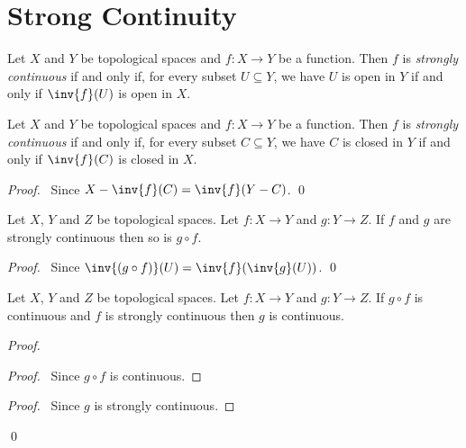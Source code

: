 \section{Strong Continuity}

\begin{definition}
    Let $X$ and $Y$ be topological spaces and $f : X \rightarrow Y$ be a function. Then $f$ is \emph{strongly continuous} if and only if, for every subset $U \subseteq Y$,
    we have $U$ is open in $Y$ if and only if $\inv{f}(U)$ is open in $X$.
\end{definition}

\begin{proposition}
    Let $X$ and $Y$ be topological spaces and $f : X \rightarrow Y$ be a function. Then $f$ is \emph{strongly continuous} if and only if, for every subset $C \subseteq Y$,
    we have $C$ is closed in $Y$ if and only if $\inv{f}(C)$ is closed in $X$.
\end{proposition}

\begin{proof}
    \pf\ Since $X - \inv{f}(C) = \inv{f}(Y - C)$. \qed
\end{proof}

\begin{proposition}
    \label{proposition:strongly_continuous_composite}
    Let $X$, $Y$ and $Z$ be topological spaces. Let $f : X \rightarrow Y$ and $g : Y \rightarrow Z$. If $f$ and $g$ are strongly continuous then so is $g \circ f$.
\end{proposition}

\begin{proof}
    \pf\ Since $\inv{(g \circ f)}(U) = \inv{f}(\inv{g}(U))$. \qed
\end{proof}

\begin{proposition}
    \label{proposition:continuous_strongly_continuous}
    Let $X$, $Y$ and $Z$ be topological spaces.
    Let $f : X \rightarrow Y$ and $g : Y \rightarrow Z$.
    If $g \circ f$ is continuous and $f$ is strongly continuous then 
    $g$ is continuous.
\end{proposition}

\begin{proof}
    \pf
    \begin{proof}
        \pf\ Since $g \circ f$ is continuous.
    \end{proof}
    \begin{proof}
        \pf\ Since $g$ is strongly continuous.
    \end{proof}
    \qed
\end{proof}

